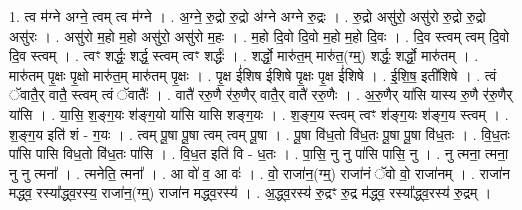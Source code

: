 \documentclass[17pt]{extarticle}
\begin{document}
1. त्व म॑ग्ने अग्ने॒ त्वम् त्व म॑ग्ने । . अ॒ग्ने॒ रु॒द्रो रु॒द्रो अ॑ग्ने अग्ने रु॒द्रः । . रु॒द्रो असु॑रो॒ असु॑रो रु॒द्रो रु॒द्रो असु॑रः । . असु॑रो म॒हो म॒हो असु॑रो॒ असु॑रो म॒हः । . म॒हो दि॒वो दि॒वो म॒हो म॒हो दि॒वः । . दि॒व स्त्वम् त्वम् दि॒वो दि॒व स्त्वम् । . त्वꣳ शर्द्धः॒ शर्द्ध॒ स्त्वम् त्वꣳ शर्द्धः॑ । . शर्द्धो॒ मारु॑त॒म् मारु॑त॒(ग्म्॒) शर्द्धः॒ शर्द्धो॒ मारु॑तम् । . मारु॑तम् पृ॒क्षः पृ॒क्षो मारु॑त॒म् मारु॑तम् पृ॒क्षः । . पृ॒क्ष ई॑शिष ईशिषे पृ॒क्षः पृ॒क्ष ई॑शिषे । . ई॒शि॒ष॒ इती॑शिषे । . त्वं ॅवातै॒र् वातै॒ स्त्वम् त्वं ॅवातैः᳚ । . वातै॑ ररु॒णै र॑रु॒णैर् वातै॒र् वातै॑ ररु॒णैः । . अ॒रु॒णैर् या॑सि यास्य रु॒णै र॑रु॒णैर् या॑सि । . या॒सि॒ श॒ङ्ग॒यः श॑ङ्ग॒यो या॑सि यासि शङ्ग॒यः । . श॒ङ्ग॒य स्त्वम् त्वꣳ श॑ङ्ग॒यः श॑ङ्ग॒य स्त्वम् । . श॒ङ्ग॒य इति॑ शं - ग॒यः । . त्वम् पू॒षा पू॒षा त्वम् त्वम् पू॒षा । . पू॒षा वि॑ध॒तो वि॑ध॒तः पू॒षा पू॒षा वि॑ध॒तः । . वि॒ध॒तः पा॑सि पासि विध॒तो वि॑ध॒तः पा॑सि । . वि॒ध॒त इति॑ वि - ध॒तः । . पा॒सि॒ नु नु पा॑सि पासि॒ नु । . नु त्मना॒ त्मना॒ नु नु त्मना᳚ । . त्मनेति॒ त्मना᳚ । . आ वो॑ व॒ आ वः॑ । . वो॒ राजा॑न॒(ग्म्॒) राजा॑नं ॅवो वो॒ राजा॑नम् । . राजा॑न मद्ध्व॒ रस्या᳚द्ध्व॒रस्य॒ राजा॑न॒(ग्म्॒) राजा॑न मद्ध्व॒रस्य॑ । . अ॒द्ध्व॒रस्य॑ रु॒द्रꣳ रु॒द्र म॑द्ध्व॒ रस्या᳚द्ध्व॒रस्य॑ रु॒द्रम् । \newline
\end{document}
